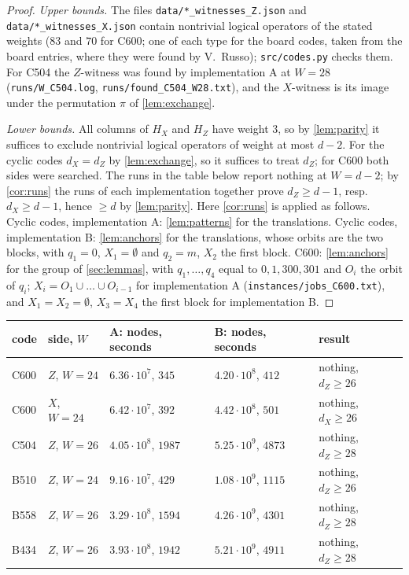 \documentclass[11pt]{amsart}
\theoremstyle{definition}
\theoremstyle{remark}
\begin{document}
\begin{proof}
\emph{Upper bounds.} The files \texttt{data/*\_witnesses\_Z.json} and \texttt{data/*\_witnesses\_X.json} contain nontrivial logical operators of the stated weights ($83$ and $70$ for C600; one of each type for the board codes, taken from the board entries, where they were found by V.~Russo); \texttt{src/codes.py} checks them. For C504 the $Z$-witness was found by implementation A at $W=28$ (\texttt{runs/W\_C504.log}, \texttt{runs/found\_C504\_W28.txt}), and the $X$-witness is its image under the permutation $\pi$ of \cref{lem:exchange}.

\emph{Lower bounds.} All columns of $H_X$ and $H_Z$ have weight $3$, so by \cref{lem:parity} it suffices to exclude nontrivial logical operators of weight at most $d-2$. For the cyclic codes $d_X=d_Z$ by \cref{lem:exchange}, so it suffices to treat $d_Z$; for C600 both sides were searched. The runs in the table below report nothing at $W=d-2$; by \cref{cor:runs} the runs of each implementation together prove $d_Z\ge d-1$, resp.\ $d_X\ge d-1$, hence $\ge d$ by \cref{lem:parity}. Here \cref{cor:runs} is applied as follows. Cyclic codes, implementation A: \cref{lem:patterns} for the translations. Cyclic codes, implementation B: \cref{lem:anchors} for the translations, whose orbits are the two blocks, with $q_1=0$, $X_1=\emptyset$ and $q_2=m$, $X_2$ the first block. C600: \cref{lem:anchors} for the group of \cref{sec:lemmas}, with $q_1,\dots,q_4$ equal to $0,1,300,301$ and $O_i$ the orbit of $q_i$; $X_i=O_1\cup\dots\cup O_{i-1}$ for implementation A (\texttt{instances/jobs\_C600.txt}), and $X_1=X_2=\emptyset$, $X_3=X_4$ the first block for implementation B.
\end{proof}

\begin{center}
\small
\begin{tabular}{lllll}
\toprule
code & side, $W$ & A: nodes, seconds & B: nodes, seconds & result\\
\midrule
C600 & $Z$, $W=24$ & $6.36\cdot10^{7}$, $345$ & $4.20\cdot10^{8}$, $412$ & nothing, $d_Z\ge26$\\
C600 & $X$, $W=24$ & $6.42\cdot10^{7}$, $392$ & $4.42\cdot10^{8}$, $501$ & nothing, $d_X\ge26$\\
C504 & $Z$, $W=26$ & $4.05\cdot10^{8}$, $1987$ & $5.25\cdot10^{9}$, $4873$ & nothing, $d_Z\ge28$\\
B510 & $Z$, $W=24$ & $9.16\cdot10^{7}$, $429$ & $1.08\cdot10^{9}$, $1115$ & nothing, $d_Z\ge26$\\
B558 & $Z$, $W=26$ & $3.29\cdot10^{8}$, $1594$ & $4.26\cdot10^{9}$, $4301$ & nothing, $d_Z\ge28$\\
B434 & $Z$, $W=26$ & $3.93\cdot10^{8}$, $1942$ & $5.21\cdot10^{9}$, $4911$ & nothing, $d_Z\ge28$\\
\bottomrule
\end{tabular}
\end{center}
\end{document}
